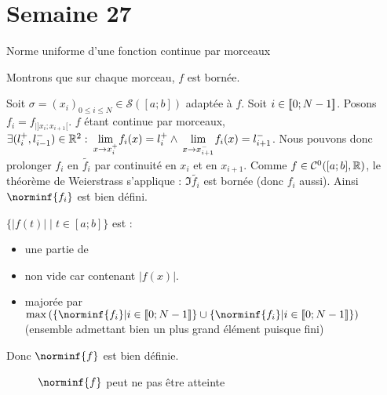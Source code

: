 \documentclass{article}
\renewenvironment{question_kholle}[2][ ]
{
	\subsection{\texorpdfstring{#2}{}}
	\notblank{#1}
	{
		\noindent #1
		\bigbreak
	}
	{}
	\begin{proof}
}
{
	\end{proof}
}
\begin{document}
\pagebreak\section{Semaine 27}

\begin{question_kholle}
	{Norme uniforme d'une fonction continue par morceaux}

	Montrons que sur chaque morceau, $f$ est bornée.

	Soit $\sigma = (x_i)_{0 \leqslant i \leqslant N} \in \mathcal{S}([a;b])$ adaptée à $f$.
	Soit $i \in [\![ 0; N-1 ]\!]$. Posons $f_i = f_{|]x_i;x_{i+1}[}$.
	$f$ étant continue par morceaux, $\exists (l_i^+, l_{i-1}^-) \in \mathbb R^2 : \lim\limits_{\;x \to x_i^+\;}\!\! f_i(x) = l_i^+ \wedge \lim\limits_{\;x \to x_{i+1}^-\;}\!\! f_i(x) = l_{i+1}^-$.
	Nous pouvons donc prolonger $f_i$ en $\tilde{f_i}$ par continuité en $x_i$ et en $x_{i+1}$.
	Comme $f \in \Cont{0}{[a;b]}{}$, le théorème de Weierstrass s'applique : $\Im \tilde{f_i}$ est bornée (donc $f_i$ aussi). Ainsi $\norminf{f_i}$ est bien défini.

	\noindent $\{ |f(t)| \;|\; t \in [a;b] \}$ est : \begin{itemize}
		\item une partie de \R
		\item non vide car contenant $|f(x)|$.
		\item majorée par $\max \left( \{\norminf{f_i} | i \in \lient 0; N-1 \rient\} \cup \{\norminf{f_i} | i \in \lient 0; N-1 \rient\} \right)$ (ensemble admettant bien un plus grand élément puisque fini)
	\end{itemize}
	Donc $\norminf{f}$ est bien définie.
	\begin{figure}[H]
		\centering
		\caption{$\norminf{f}$ peut ne pas être atteinte}
	\end{figure}
\end{question_kholle}
\end{document}
